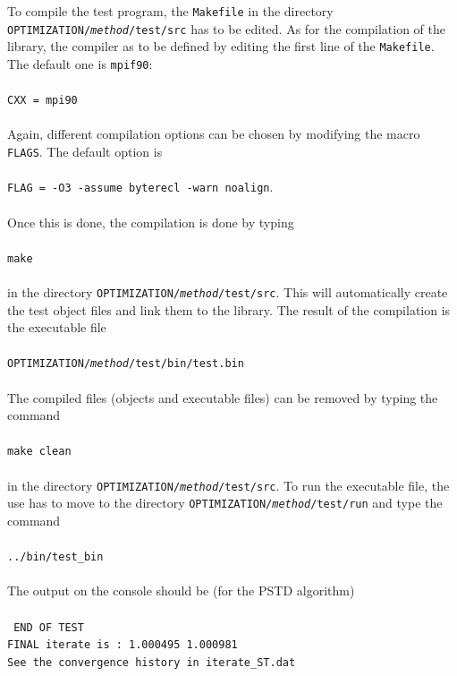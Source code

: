 \documentclass[a4paper,twoside,final,onecolumn,11pt,openright]{article}
\begin{document}
To compile the test program, the \texttt{Makefile} in the directory \texttt{OPTIMIZATION/\textit{method}/test/src} has to be edited. As for the compilation of the library, the compiler as to be defined by editing the first line of the \texttt{Makefile}. The default one is \texttt{mpif90}:
\\
\\
\texttt{CXX    =   mpi90}
\\
\\
Again, different compilation options can be chosen by modifying the macro \texttt{FLAGS}. The default option is 
\\
\\
\texttt{FLAG  =  -O3 -assume byterecl -warn noalign}. 
\\
\\
Once this is done, the compilation is done by typing 
\\
\\
\texttt{make}
\\
\\
in the directory \texttt{OPTIMIZATION/\textit{method}/test/src}. This will automatically create the test object files and link them to the library. The result of the compilation is the executable file 
\\
\\
\texttt{OPTIMIZATION/\textit{method}/test/bin/test.bin}
\\
\\
The compiled files (objects and executable files) can be removed by typing the command
\\
\\
\texttt{make clean}
\\
\\
in the directory \texttt{OPTIMIZATION/\textit{method}/test/src}. To run the executable file, the use has to move to the directory \texttt{OPTIMIZATION/\textit{method}/test/run} and type the command
\\
\\
\texttt{../bin/test\_bin}
\\
\\
The output on the console should be (for the PSTD algorithm)
\\
\\
\texttt{
 END OF TEST
 \\
 FINAL iterate is :    1.000495       1.000981    
 \\
 See the convergence history in iterate\_ST.dat
}
\end{document}
